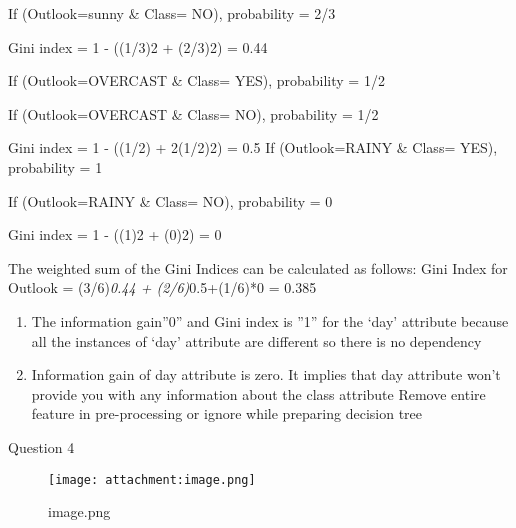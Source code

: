 \documentclass[11pt]{article}
\begin{document}
If (Outlook=sunny \& Class= NO), probability = 2/3

Gini index = 1 - ((1/3)2 + (2/3)2) = 0.44

If (Outlook=OVERCAST \& Class= YES), probability = 1/2

If (Outlook=OVERCAST \& Class= NO), probability = 1/2

Gini index = 1 - ((1/2) + 2(1/2)2) = 0.5 If (Outlook=RAINY \& Class=
YES), probability = 1

If (Outlook=RAINY \& Class= NO), probability = 0

Gini index = 1 - ((1)2 + (0)2) = 0

The weighted sum of the Gini Indices can be calculated as follows: Gini
Index for Outlook = (3/6)\emph{0.44 + (2/6)}0.5+(1/6)*0 = 0.385

\begin{enumerate}
\def\labelenumi{\arabic{enumi})}
\setcounter{enumi}{3}
\item
  The information gain''0'' and Gini index is ''1'' for the `day'
  attribute because all the instances of `day' attribute are different
  so there is no dependency
\item
  Information gain of day attribute is zero. It implies that day
  attribute won't provide you with any information about the class
  attribute Remove entire feature in pre-processing or ignore while
  preparing decision tree
\end{enumerate}

    Question 4

    \begin{figure}
\centering
\texttt{[image: attachment:image.png]}
\caption{image.png}
\end{figure}
\end{document}
